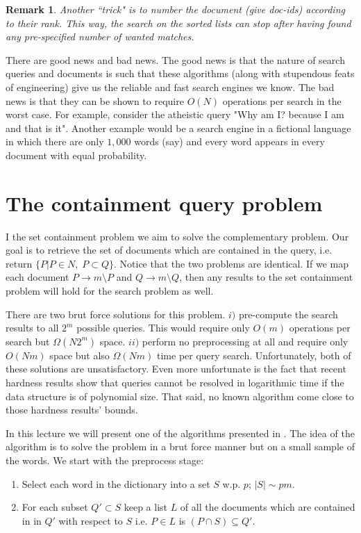 \documentclass{article}
\newtheorem{remark}[theorem]{Remark}
\begin{document}
\begin{remark}
Another ``trick" is to number the document
(give doc-ids) according to their rank. This way, the search on the sorted lists can stop after having found any pre-specified number of wanted matches. 
\end{remark}

There are good news and bad news. The good news is that the nature of search queries and documents is such
that these algorithms (along with stupendous feats of engineering) give us the reliable and fast search engines we know.
The bad news is that they can be shown to require $O(N)$ operations per search in the worst case.
For example, consider the atheistic query "Why am I? because I am and that is it". Another example would
be a search engine in a fictional language in which there are only $1,000$ words (say) and every word appears
in every document with equal probability. 


\section{The containment query problem}
I the set containment problem we aim to solve the complementary problem. Our goal is to retrieve
the set of documents which are contained in the query, i.e. return $\{P | P \in N , \; P \subset Q\}$.
Notice that the two problems are identical. If we map each document $P \rightarrow m \setminus P$ and
$Q \rightarrow m \setminus Q$, then any results to the set containment problem will hold for the search problem as well.

There are two brut force solutions for this problem. 
$i)$ pre-compute the search results to all $2^m$ possible queries.
This would require only $O(m)$ operations per search but $\Omega(N2^m)$ space.
$ii)$ perform no preprocessing at all and require only $O(Nm)$ space but also $\Omega(Nm)$ time per query search.
Unfortunately, both of these solutions are unsatisfactory. Even more unfortunate is the fact that recent 
hardness results show that queries cannot be resolved in logarithmic time if the data structure is of polynomial size.
That said, no known algorithm come close to those hardness results' bounds.



In this lecture we will present one of the algorithms presented in \cite{CIP02}.
The idea of the algorithm is to solve the problem in a brut force manner but on a small sample of the words.
We start with the  preprocess stage: 
\begin{enumerate}
\item Select each word in the dictionary into a set $S$ w.p. $p$; $|S| \sim pm$.
\item For each subset $Q' \subset S$ keep a list $L$ of all the documents which are contained in
in $Q'$ with respect to $S$ i.e. $P \in L$ is $(P \cap S) \subseteq Q'$. 
\end{enumerate}
\end{document}
